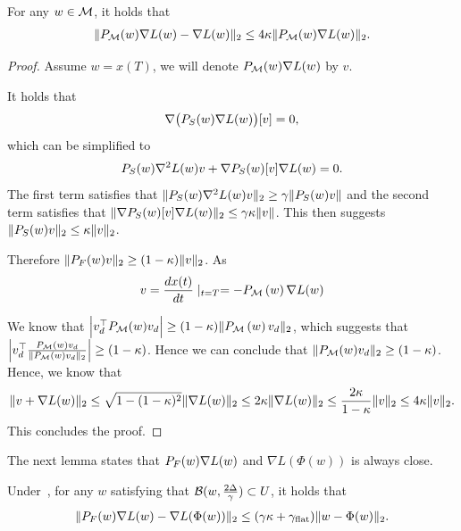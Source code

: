 \begin{lemma}
\label{lem:alignspace}
For any $w \in \mathcal{M}$, it holds that 
\begin{align*}
    \| {P}_{\mathcal{M}}(w) \nabla L(w)  - \nabla L(w) \|_2 \le 4\kappa  \| {P}_{\mathcal{M}}(w) \nabla L(w)   \|_2.
\end{align*}
\end{lemma}
\begin{proof}

Assume $w = x(T)$, we will denote ${P}_{\mathcal{M}}(w) \nabla L(w) $ by $v$.


It holds that
    \begin{align*}
        \nabla \big( {P}_S(w) \nabla L(w) \big)[v] = 0,
    \end{align*}
    which can be simplified to
    \begin{align*}
        {P}_S(w) \nabla^2 L(w) v + \nabla {P}_S(w)[v] \nabla L(w) = 0.
    \end{align*}
    The first term satisfies that $\|{P}_S(w) \nabla^2 L(w) v \|_2 \ge \gamma \| {P}_S(w) v\|$ and the second term satisfies that $\|  \nabla {P}_S(w)[v] \nabla L(w)\|_2 \le \gamma \kappa \| v\|$. This then suggests $\| {P}_S(w) v \|_2 \le \kappa \| v \|_2$. 
    
    Therefore $\| {P}_F(w) v\|_2  \ge (1 - \kappa) \| v \|_2$. As 
    \begin{align*}
        v = \frac{d x(t)}{dt} \mid_{t = T} = -{P}_{\mathcal{M}} \left(w\right) \nabla L(w) 
    \end{align*}


   We know that $\Big | v_d^\top {P}_{\mathcal{M}}(w) v_d \Big | \ge (1 - \kappa) \|  {P}_{\mathcal{M}} \left(w\right) v_d\|_2$, which suggests that $\Big | v_d^\top \frac{ {P}_{\mathcal{M}}(w) v_d} {\|  {P}_{\mathcal{M}}(w) v_d \|_2} \Big | \ge ( 1- \kappa)$. Hence we can conclude that $\| {P}_{\mathcal{M}}(w) v_d \|_2 \ge (1 - \kappa)$. Hence, we know that
   \begin{align*}
       \| v + \nabla L(w) \|_2 \le \sqrt{1 - (1- \kappa)^2} \| \nabla L(w) \|_2\le 2 \kappa \| \nabla L(w) \|_2 \le \frac{2 \kappa}{1 - \kappa} \| v \|_2 \le 4 \kappa \| v\|_2.
   \end{align*}
   This concludes the proof.
\end{proof}




The next lemma states that ${P}_F(w) \nabla L(w)$ and $\nabla L(\Phi(w))$ is always close.

\begin{lemma}
\label{lem:simgrad}
Under~, for any $w$ satisfying that $\mathcal{B}(w, \frac{2 \Delta}{\gamma}) \subset U$,  it holds that 
\begin{align*}
    \| {P}_F(w) \nabla L(w) - \nabla L(\Phi(w)) \|_2 \le (\gamma \kappa  + \gamma_{\mathrm{flat}}) \| w - \Phi(w)\|_2.
\end{align*}
\end{lemma}

